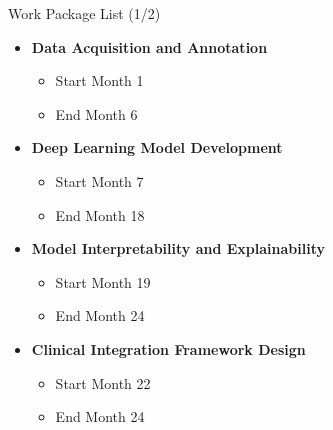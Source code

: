 \documentclass{beamer}
\begin{document}
\begin{frame}{Work Package List (1/2)}
  \begin{itemize}
    \item \textbf{Data Acquisition and Annotation}
    \begin{itemize}
      \item Start Month 1
      \item End Month 6
    \end{itemize}
    
    \item \textbf{Deep Learning Model Development}
    \begin{itemize}
      \item Start Month 7
      \item End Month 18
    \end{itemize}
    
    \item \textbf{Model Interpretability and Explainability}
    \begin{itemize}
      \item Start Month 19
      \item End Month 24
    \end{itemize}
    
    \item \textbf{Clinical Integration Framework Design}
    \begin{itemize}
      \item Start Month 22
      \item End Month 24
    \end{itemize}
  \end{itemize}
\end{frame}
\end{document}
